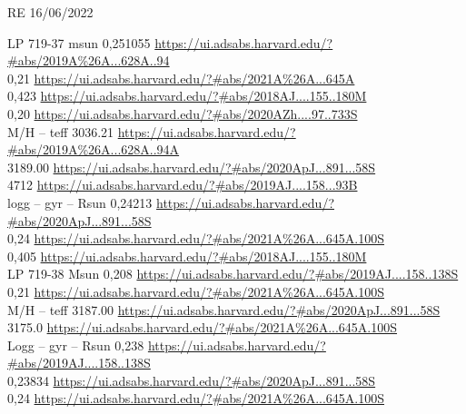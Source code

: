 RE 16/06/2022


LP 719-37 
msun
0,251055	\url{ https://ui.adsabs.harvard.edu/?#abs/2019A%26A...628A..94}\\
0,21	\url{https://ui.adsabs.harvard.edu/?#abs/2021A%26A...645A}\\
0,423  \url{ https://ui.adsabs.harvard.edu/?#abs/2018AJ....155..180M}\\
0,20 \url{https://ui.adsabs.harvard.edu/?#abs/2020AZh....97..733S}\\
M/H
--
teff
3036.21 \url{https://ui.adsabs.harvard.edu/?#abs/2019A%26A...628A..94A}\\
3189.00	\url{https://ui.adsabs.harvard.edu/?#abs/2020ApJ...891...58S}\\
4712   \url{https://ui.adsabs.harvard.edu/?#abs/2019AJ....158...93B}\\
logg
--
gyr
--
Rsun 
0,24213 \url{https://ui.adsabs.harvard.edu/?#abs/2020ApJ...891...58S}\\
0,24 \url{https://ui.adsabs.harvard.edu/?#abs/2021A%26A...645A.100S}\\
0,405 \url{https://ui.adsabs.harvard.edu/?#abs/2018AJ....155..180M}\\


LP 719-38 
Msun
0,208 \url{https://ui.adsabs.harvard.edu/?#abs/2019AJ....158..138S}\\
0,21  \url{https://ui.adsabs.harvard.edu/?#abs/2021A%26A...645A.100S}\\
M/H
--
teff
3187.00  \url{https://ui.adsabs.harvard.edu/?#abs/2020ApJ...891...58S}\\
3175.0  \url{https://ui.adsabs.harvard.edu/?#abs/2021A%26A...645A.100S}\\
Logg 
--
gyr
--
Rsun 
0,238  \url{https://ui.adsabs.harvard.edu/?#abs/2019AJ....158..138S}\\
0,23834  \url{https://ui.adsabs.harvard.edu/?#abs/2020ApJ...891...58S}\\
0,24  \url{https://ui.adsabs.harvard.edu/?#abs/2021A%26A...645A.100S}\\